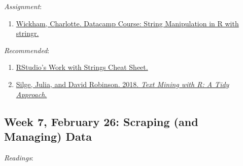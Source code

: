 \documentclass[]{article}
\providecommand{\tightlist}{%
  \setlength{\itemsep}{0pt}\setlength{\parskip}{0pt}}
\begin{document}
\emph{Assignment}:

\begin{enumerate}
\def\labelenumi{\arabic{enumi}.}
\tightlist
\item
  \href{https://www.datacamp.com/courses/string-manipulation-in-r-with-stringr}{Wickham,
  Charlotte. Datacamp Course: String Manipulation in R with stringr.}
\end{enumerate}

\emph{Recommended}:

\begin{enumerate}
\def\labelenumi{\arabic{enumi}.}
\item
  \href{https://github.com/rstudio/cheatsheets/raw/master/strings.pdf}{RStudio's
  Work with Strings Cheat Sheet.}
\item
  \href{https://www.tidytextmining.com/index.html}{Silge, Julia, and
  David Robinson. 2018. \emph{Text Mining with R: A Tidy Approach}.}
\end{enumerate}

\pagebreak

\hypertarget{week-7-february-26-scraping-and-managing-data}{%
\subsection{Week 7, February 26: Scraping (and Managing)
Data}\label{week-7-february-26-scraping-and-managing-data}}

\emph{Readings}:
\end{document}
